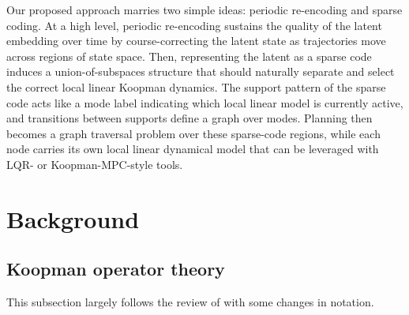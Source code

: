 Our proposed approach marries two simple ideas: periodic re-encoding and sparse coding.
At a high level, periodic re-encoding sustains the quality of the latent embedding over time by course-correcting the latent state as trajectories move across regions of state space. Then, representing the latent as a sparse code induces a union-of-subspaces structure that should naturally separate and select the correct local linear Koopman dynamics.
The support pattern of the sparse code acts like a mode label indicating which local linear model is currently active, and transitions between supports define a graph over modes.
Planning then becomes a graph traversal problem over these sparse-code regions, while each node carries its own local linear dynamical model that can be leveraged with LQR- or Koopman-MPC-style tools.

\section{Background}
\label{sec:background}

\subsection{Koopman operator theory}
\label{sec:koopman-background}

This subsection largely follows the review of \citet{brunton_modern_2022} with some changes in notation. 

